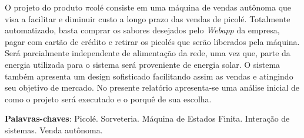 \begin{resumo}

O projeto do produto $\pi$colé consiste em uma máquina de vendas autônoma que visa a facilitar e diminuir custo a longo prazo das vendas de picolé. Totalmente automatizado, basta comprar os sabores desejados pelo \textit{Webapp} da empresa, pagar com cartão de crédito e retirar os picolés que serão liberados pela máquina. Será parcialmente independente de alimentação da rede, uma vez que, parte da energia utilizada para o sistema será proveniente de energia solar. O sistema também apresenta um design sofisticado facilitando assim as vendas e atingindo seu objetivo de mercado. No presente relatório apresenta-se uma análise inicial de como o projeto será executado e o porquê de sua escolha.



 \vspace{\onelineskip}
    
 \noindent
 \textbf{Palavras-chaves}: Picolé. Sorveteria. Máquina de Estados Finita. Interação de sistemas. Venda autônoma.
\end{resumo}

